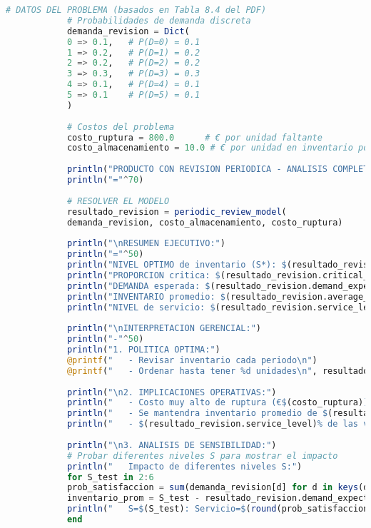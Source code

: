 \documentclass[12pt,a4paper]{book}
\begin{document}
	\begin{tcolorbox}[enhanced,colback=azulclaro,colframe=azulprincipal,boxrule=2pt,arc=8pt,
		title={\bfseries\color{white} \faCode\ SOLUCI\'ON COMPLETA},breakable]
		
		\begin{lstlisting}[language=Julia,basicstyle=\footnotesize\ttfamily]
			# DATOS DEL PROBLEMA (basados en Tabla 8.4 del PDF)
			# Probabilidades de demanda discreta  
			demanda_revision = Dict(
			0 => 0.1,   # P(D=0) = 0.1
			1 => 0.2,   # P(D=1) = 0.2  
			2 => 0.2,   # P(D=2) = 0.2
			3 => 0.3,   # P(D=3) = 0.3
			4 => 0.1,   # P(D=4) = 0.1
			5 => 0.1    # P(D=5) = 0.1
			)
			
			# Costos del problema
			costo_ruptura = 800.0      # € por unidad faltante
			costo_almacenamiento = 10.0 # € por unidad en inventario por periodo
			
			println("PRODUCTO CON REVISION PERIODICA - ANALISIS COMPLETO")
			println("="^70)
			
			# RESOLVER EL MODELO
			resultado_revision = periodic_review_model(
			demanda_revision, costo_almacenamiento, costo_ruptura)
			
			println("\nRESUMEN EJECUTIVO:")
			println("="^50)
			println("NIVEL OPTIMO de inventario (S*): $(resultado_revision.optimal_S) unidades")
			println("PROPORCION critica: $(resultado_revision.critical_ratio)")
			println("DEMANDA esperada: $(resultado_revision.demand_expected) unidades")
			println("INVENTARIO promedio: $(resultado_revision.average_inventory) unidades")
			println("NIVEL de servicio: $(resultado_revision.service_level)%")
			
			println("\nINTERPRETACION GERENCIAL:")
			println("-"^50)
			println("1. POLITICA OPTIMA:")
			@printf("   - Revisar inventario cada periodo\n")
			@printf("   - Ordenar hasta tener %d unidades\n", resultado_revision.optimal_S)
			
			println("\n2. IMPLICACIONES OPERATIVAS:")
			println("   - Costo muy alto de ruptura (€$(costo_ruptura)) justifica inventario alto")
			println("   - Se mantendra inventario promedio de $(resultado_revision.average_inventory) unidades")
			println("   - $(resultado_revision.service_level)% de las veces se satisfara la demanda completamente")
			
			println("\n3. ANALISIS DE SENSIBILIDAD:")
			# Probar diferentes niveles S para mostrar el impacto
			println("   Impacto de diferentes niveles S:")
			for S_test in 2:6
			prob_satisfaccion = sum(demanda_revision[d] for d in keys(demanda_revision) if d <= S_test)
			inventario_prom = S_test - resultado_revision.demand_expected
			println("   S=$(S_test): Servicio=$(round(prob_satisfaccion*100,digits=1))%, Inv.Prom=$(round(inventario_prom,digits=1))")
			end
			

\end{lstlisting}
\end{tcolorbox}
\end{document}
